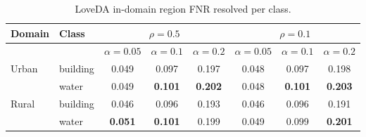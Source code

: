\begin{table}[t]
\centering
\caption{LoveDA in-domain region FNR resolved per class.}
\label{tab:loveda_perclass}
\scriptsize
\setlength{\tabcolsep}{2pt}
\begin{tabular}{llcccccc}
\toprule
Domain & Class & \multicolumn{3}{c}{$\rho=0.5$} & \multicolumn{3}{c}{$\rho=0.1$} \\
\midrule
 & & $\alpha=0.05$ & $\alpha=0.1$ & $\alpha=0.2$ & $\alpha=0.05$ & $\alpha=0.1$ & $\alpha=0.2$ \\
\midrule
Urban & building & 0.049 & 0.097 & 0.197 & 0.048 & 0.097 & 0.198 \\
 & water & 0.049 & \textbf{0.101} & \textbf{0.202} & 0.048 & \textbf{0.101} & \textbf{0.203} \\
\addlinespace
Rural & building & 0.046 & 0.096 & 0.193 & 0.046 & 0.096 & 0.191 \\
 & water & \textbf{0.051} & \textbf{0.101} & 0.199 & 0.049 & 0.099 & \textbf{0.201} \\
\bottomrule
\end{tabular}
\end{table}
